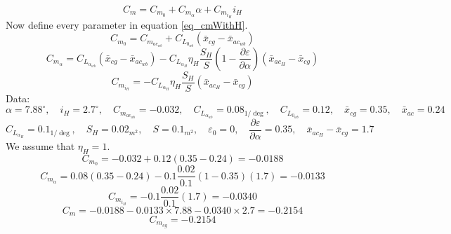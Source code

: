 \begin{equation}
C_m = C_{m_0} + C_{m_\alpha}\alpha + C_{m_{i_H}} i_H
\label{eq_cmWithH}
\end{equation}
Now define every parameter in equation \ref{eq_cmWithH}.
\begin{equation}
C_{m_0} = C_{m_{ac_{wb}}} + C_{L_{0_{wb}}}(\bar x_{cg} - \bar x_{ac_{wb}})
\label{eq_cmzero}
\end{equation}
\begin{equation}
C_{m_\alpha} = C_{L_{\alpha_{wb}}}(\bar x_{cg} - \bar x_{ac_{wb}})-
C_{L_{\alpha_{H}}}\eta_H
\dfrac{S_H}{S}
(1-\dfrac{\partial \varepsilon}{\partial \alpha})
(\bar x_{ac_{H}}-\bar x_{cg})
\label{eq_cmalpha}
\end{equation}
\begin{equation}C_{m_{i_H}} = -C_{L_{\alpha_{H}}}\eta_H
\dfrac{S_H}{S}
(\bar x_{ac_{H}}-\bar x_{cg})\end{equation}
Data:
$$\alpha = 7.88^{\circ},\quad i_H = 2.7^{\circ}
,\quad C_{m_{ac_{wb}}} = -0.032,\quad C_{L_{\alpha_{wb}}}= 0.08_{1/\deg}
,\quad C_{L_{0_{wb}}}= 0.12
,\quad \bar x_{cg} = 0.35
,\quad \bar x_{ac} = 0.24
$$
$$
C_{L_{\alpha_{H}}} = 0.1_{1/\deg}, \quad S_H = 0.02_{m^2}, \quad S = 0.1_{m^2}, \quad \varepsilon_0 = 0
, \quad
\dfrac{\partial \varepsilon}{\partial \alpha} = 0.35,\quad
\bar x_{ac_{H}}-\bar x_{cg} = 1.7
$$
We assume that $\eta_H = 1$.
$$C_{m_0} = -0.032 + 0.12(0.35-0.24) = -0.0188$$
$$C_{m_\alpha} = 0.08(0.35-0.24)-0.1\frac{0.02}{0.1}(1-0.35)(1.7) = -0.0133 $$
$$C_{m_{i_H}} = -0.1\frac{0.02}{0.1}(1.7)=-0.0340$$
$$C_m = -0.0188 - 0.0133\times7.88 - 0.0340 \times 2.7 = -0.2154$$
$$C_{m_{cg}} = -0.2154$$